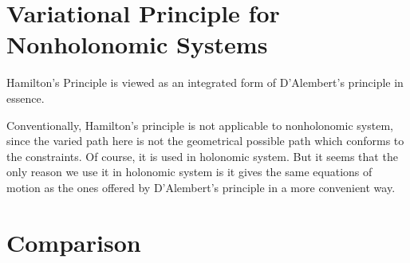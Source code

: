 \documentclass[prb,preprint]{revtex4-1}
\begin{document}
\section{Variational Principle for Nonholonomic Systems}
\label{sec:variational}
Hamilton's Principle is viewed as an integrated form of D'Alembert's
principle in essence.

Conventionally, Hamilton's principle is not applicable to nonholonomic
system, since the varied path here is not the geometrical possible
path which conforms to the constraints. Of course, it is used in
holonomic system. But it seems that the only reason we use it in
holonomic system is it gives the same equations of motion as the ones
offered by D'Alembert's principle in a more convenient way.


\section{Comparison}
\label{sec:comparison}
\end{document}
